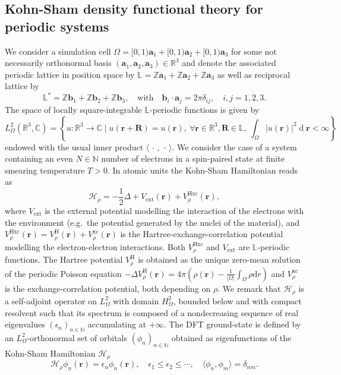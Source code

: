 \documentclass[hidelinks,onefignum,onetabnum]{siamart250211}
\newcommand{\R}{\mathbb{R}}
\newcommand{\C}{\mathbb{C}}
\newcommand{\N}{\mathbb{N}}
\newcommand{\Z}{\mathbb{Z}}
\newcommand{\D}{\mathrm{d}}
\newcommand{\dd}{\operatorname{d}}
\renewcommand{\vec}{\bm}
\newcommand{\Vext}{V_{\mathrm{ext}}} %
\newcommand{\Vxc}{V^{\mathrm{xc}}} %
\newcommand{\VH}{V^{\mathrm{H}}} %
\newcommand{\VHxc}{V^{\text{Hxc}}} %
\newcommand{\La}{\mathbb{L}}
\newcommand{\Hrho}{\mathcal{H}_\rho}
\begin{document}
\subsection{Kohn-Sham density functional theory for periodic systems}
\label{sec:DFT}
We consider a simulation cell $\Omega = [0,1) \bm a_1 + [0,1) \bm a_2 + [0,1) \bm a_3$
for some not necessarily orthonormal basis $(\bm a_1, \bm a_2, \bm a_3)  \in \R^3$
and denote the associated periodic lattice in position space by
$\La = \Z \bm a_1 + \Z \bm a_2 + \Z \bm a_3$ as well as reciprocal lattice by
\begin{equation}
  \La^* = \Z \bm b_1 + \Z \bm b_2 + \Z \bm b_3, \quad \text{with} \quad \bm b_i \cdot \bm a_j = 2\pi \delta_{ij}, \quad i,j = 1,2,3.
\end{equation}
The space of locally square-integrable $\La$-periodic functions is given by
\begin{equation}
  L^2_{\Omega}(\R^3, \C) = \left\{ u: \R^3 \to \C \mid u(\bm r + \bm R) = u(\bm r), \ \forall \bm r \in \R^3, \bm R \in \La, \ \int_{\Omega} |u(\bm r)|^2 \dd \bm r < \infty \right\}
\end{equation}
endowed with the usual inner product $\langle\,\cdot\,,\,\cdot\,\rangle$.
%
%
%
%
%
%
%
%
%
%
We consider the case of a system containing an even $N \in \N$ number of electrons in a spin-paired state
at finite smearing temperature $T > 0$.
In atomic units the Kohn-Sham Hamiltonian reads as
\begin{equation}
    \Hrho = - \frac{1}{2}\Delta + \Vext(\vec{r}) + \VHxc_\rho(\vec{r}),
    \label{eqn:Hamiltonian}
\end{equation}
where $\Vext$ is the external potential modelling the interaction of the electrons with the environment
(e.g.~the potential generated by the nuclei of the material), and $\VHxc_\rho(\vec{r}) = \VH_\rho(\vec{r}) + \Vxc_\rho(\vec{r})$
is the Hartree-exchange-correlation potential modelling the electron-electron interactions.
Both $\VHxc_\rho$ and $\Vext$ are $\La$-periodic functions.
The Hartree potential $\VH_\rho$ is obtained as the unique zero-mean solution of the
periodic Poisson equation $-\Delta \VH_\rho(\vec{r}) = 4\pi \left( \rho(\vec{r}) - \frac1{|\Omega|} \int_\Omega \rho \D r \right)$
and $\Vxc_\rho$ is the exchange-correlation potential, both depending on $\rho$.
We remark that $\Hrho$ is a self-adjoint operator on $L^2_{\Omega}$ with domain $H^2_{\Omega}$, bounded below and with compact resolvent such that its spectrum is composed of a nondecreasing sequence of real eigenvalues
$(\epsilon_n)_{n\in\N}$ accumulating at $+\infty$. 
The DFT ground-state is defined by an $L^2_{\Omega}$-orthonormal
set of orbitals $(\phi_n)_{n\in\N}$ obtained as eigenfunctions of the Kohn-Sham Hamiltonian $\Hrho$
\begin{equation}
    \Hrho \phi_n(\bm r) = \epsilon_n \phi_n(\bm r), \quad
    \epsilon_1 \leq \epsilon_2 \leq \cdots, \quad
    \langle \phi_n, \phi_m \rangle = \delta_{nm}.
    \label{eq:KS}
\end{equation}
\end{document}
